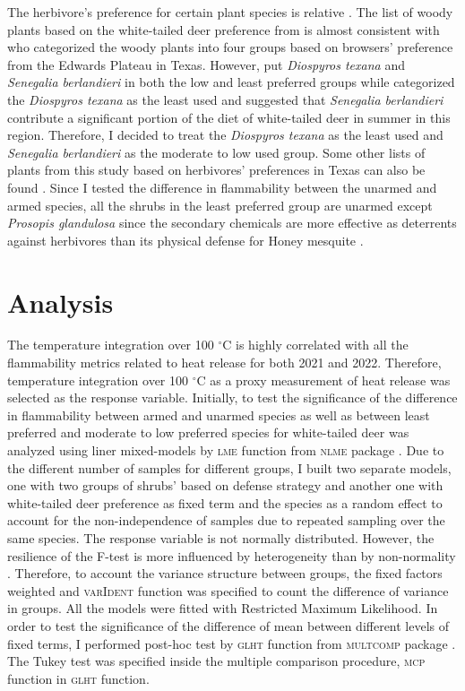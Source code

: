 \documentclass[12pt]{report}
\newcommand{\pkg}[1]{\textsc{#1}}
\begin{document}
The herbivore’s preference for certain plant species is relative \citep{wright2003white}. The list of woody plants based on the white-tailed deer preference from \citep{wright2003white} is almost consistent with \citep{nelle1996management} who categorized the woody plants into four groups based on browsers’ preference from the Edwards Plateau in Texas. However,  \citep{wright2003white} put \emph{Diospyros texana} and \emph{Senegalia berlandieri} in both the low and least preferred groups while \citep{nelle1996management} categorized the \emph{Diospyros texana} as the least used and \citep*{varner1987southern} suggested that \emph{Senegalia berlandieri} contribute a significant portion of the diet of white-tailed deer in summer in this region.  Therefore, I decided to treat the \emph{Diospyros texana} as the least used and \emph{Senegalia berlandieri} as the moderate to low used group. Some other lists of plants from this study based on herbivores’ preferences in Texas can also be found \citep{arnold1979seasonallist, nelle2001ecological, everitt1974springfoodhabit, dillard2006whitetaileddeer}. Since I tested the difference in flammability between the unarmed and armed species, all the shrubs in the least preferred group are unarmed except \emph{Prosopis glandulosa} since the secondary chemicals are more effective as deterrents against herbivores than its physical defense for Honey mesquite \citep{wright2003white}.

\section{Analysis}
The temperature integration over 100 $^{\circ}$C is highly correlated with all the flammability metrics related to heat release for both 2021 and 2022. Therefore, temperature integration over 100 $^{\circ}$C as a proxy measurement of heat release was selected as the response variable. Initially, to test the significance of the difference in flammability between armed and unarmed species as well as between least preferred and moderate to low preferred species for white-tailed deer was analyzed using liner mixed-models by \pkg{lme} function from \pkg{nlme} package \citep{pinheiro2017package}. Due to the different number of samples for different groups, I  built two separate models, one with two groups of shrubs' based on defense strategy and another one with white-tailed deer preference as fixed term and the species as a random effect to account for the non-independence of samples due to repeated sampling over the same species. The response variable is not normally distributed. However, the resilience of the F-test is more influenced by heterogeneity than by non-normality \citep{blanca2017non}. Therefore, to account the variance structure between groups, the fixed factors weighted and \pkg{varIdent} function was specified to count the difference of variance in groups. All the models were fitted with Restricted Maximum Likelihood. In order to test the significance of the difference of mean between different levels of fixed terms, I performed post-hoc test by \pkg{glht} function from \pkg{multcomp} package \citep{hothorn2016package}. The Tukey test was specified inside the multiple comparison procedure, \pkg{mcp} function in
\pkg{glht} function.
\end{document}
